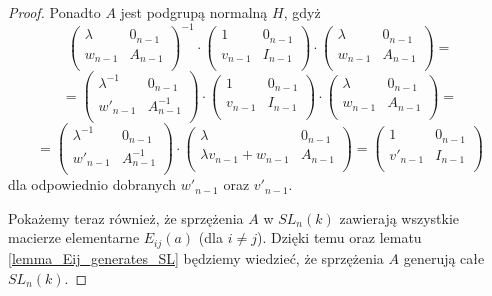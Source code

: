 \documentclass[licencjacka]{pracamgr}
\begin{document}
\begin{proof}
  Ponadto $A$ jest podgrupą normalną $H$, gdyż
  $$
    \left( \begin{array}{cc} \lambda & 0_{n-1} \\ w_{n-1} & A_{n-1} \\ \end{array} \right)^{-1} \cdot
    \left( \begin{array}{cc} 1 & 0_{n-1} \\ v_{n-1} & I_{n-1} \\ \end{array} \right)  \cdot
    \left( \begin{array}{cc} \lambda & 0_{n-1} \\ w_{n-1} & A_{n-1} \\ \end{array} \right) = 
  $$
  $$ = 
    \left( \begin{array}{cc} \lambda^{-1} & 0_{n-1} \\ w'_{n-1} & A^{-1}_{n-1} \\ \end{array} \right) \cdot
    \left( \begin{array}{cc} 1 & 0_{n-1} \\ v_{n-1} & I_{n-1} \\ \end{array} \right)  \cdot
    \left( \begin{array}{cc} \lambda & 0_{n-1} \\ w_{n-1} & A_{n-1} \\ \end{array} \right) = 
  $$
  $$ = 
    \left( \begin{array}{cc} \lambda^{-1} & 0_{n-1} \\ w'_{n-1} & A^{-1}_{n-1} \\ \end{array} \right) \cdot
    \left( \begin{array}{cc} \lambda & 0_{n-1} \\ \lambda v_{n-1} + w_{n-1} & A_{n-1} \\ \end{array} \right) = 
    \left( \begin{array}{cc} 1 & 0_{n-1} \\ v'_{n-1} & I_{n-1} \\ \end{array} \right)  
  $$
  dla odpowiednio dobranych $w'_{n-1}$ oraz $v'_{n-1}$.

  Pokażemy teraz również, że sprzężenia $A$ w $SL_n(k)$ zawierają wszystkie macierze elementarne $E_{i j}(a)$ (dla $i \ne j$).
  Dzięki temu oraz lematu \ref{lemma_Eij_generates_SL} będziemy wiedzieć, że sprzężenia $A$ generują całe $SL_n(k)$.


\end{proof}
\end{document}

